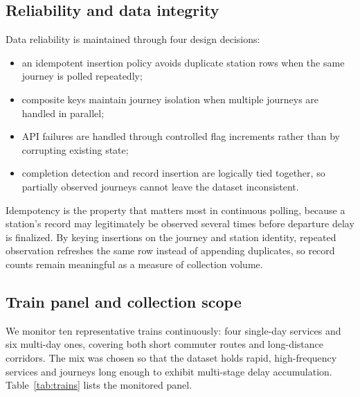 \documentclass[a4paper,fleqn]{cas-dc}
\begin{document}
\subsection{Reliability and data integrity}
Data reliability is maintained through four design decisions:
\begin{itemize}
    \item an idempotent insertion policy avoids duplicate station rows when
          the same journey is polled repeatedly;
    \item composite keys maintain journey isolation when multiple journeys
          are handled in parallel;
    \item API failures are handled through controlled flag increments rather
          than by corrupting existing state;
    \item completion detection and record insertion are logically tied
          together, so partially observed journeys cannot leave the dataset
          inconsistent.
\end{itemize}
Idempotency is the property that matters most in continuous polling, because
a station's record may legitimately be observed several times before
departure delay is finalized. By keying insertions on the journey and station
identity, repeated observation refreshes the same row instead of appending
duplicates, so record counts remain meaningful as a measure of collection
volume.

\subsection{Train panel and collection scope}
We monitor ten representative trains continuously: four single-day services and
six multi-day ones, covering both short commuter routes and long-distance
corridors. The mix was chosen so that the dataset holds rapid, high-frequency
services and journeys long enough to exhibit multi-stage delay accumulation.
Table~\ref{tab:trains} lists the monitored panel.
\end{document}
